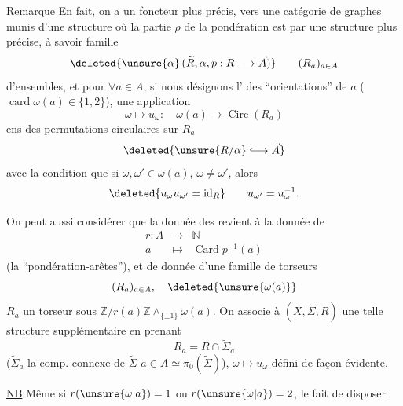 
\uline{Remarque} En fait, on a un foncteur plus précis, vers une catégorie de graphes munis d'une structure où la partie $\rho$ de la pondération est   par une structure plus précise, à savoir   famille
\[
 \deleted{\unsure{\alpha}\,(\widetilde R,\alpha,p:R\longrightarrow\vec A)}
 \qquad (R_a)_{a\in A}
\]
d'ensembles, et pour $\forall a\in A$, si nous désignons l' des
``orientations'' de $a$ ($\operatorname{card}\omega(a)\in\{1,2\}$), une application
\[
 \omega\longmapsto u_\omega:\quad \omega(a)\longrightarrow\operatorname{Circ}(R_a)
\]
ens des permutations circulaires sur $R_a$
\[
 \deleted{\unsure{R/\alpha}\lhook\joinrel\longrightarrow\vec A}
\]
avec la condition que si $\omega,\omega'\in\omega(a)$, $\omega\ne\omega'$, alors
\[
 \deleted{u_\omega u_{\omega'}=\operatorname{id}_R}
 \qquad u_{\omega'}=u_\omega^{-1}.
\]

On peut aussi considérer que la donnée des  revient à la donnée de
\[
 \begin{array}{rcl}
 r:A&\longrightarrow&\mathbb N\\
 a&\longmapsto&\operatorname{Card}p^{-1}(a)
 \end{array}
\]
(la ``pondération-arêtes''), et de donnée d'une famille de torseurs
\[
 (R_a)_{a\in A},\quad \deleted{\unsure{\omega(a)}}
\]
$R_a$ un torseur sous $\mathbb Z/r(a)\mathbb Z\mathbin{\wedge}_{\{\pm1\}}\omega(a)$.
On associe à $(X,\widetilde\Sigma,R)$ une telle structure supplémentaire en prenant
\[
 R_a=R\cap\widetilde\Sigma_a
\]
($\widetilde\Sigma_a$ la comp. connexe de $\widetilde\Sigma$   $a\in A\simeq\pi_0(\widetilde\Sigma)$),
$\omega\longmapsto u_\omega$ défini de façon évidente.

\uline{NB} Même si $r(\unsure{\omega|a})=1$ ou $r(\unsure{\omega|a})=2$, le fait de disposer

